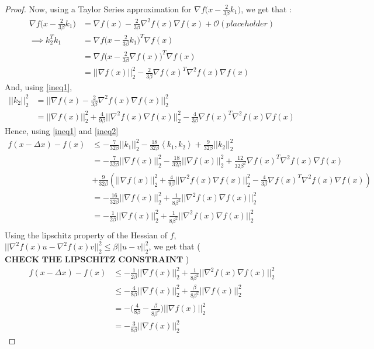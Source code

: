 \documentclass[12pt,twoside]{article}
\begin{document}
\begin{proof}
Now, using a Taylor Series approximation for $\nabla f \big( x - \frac{2}{3\beta}k_1 \big)$, we get that :
\begin{equation} 
\begin{aligned}\label{ineq1}
\nabla f \big( x - \frac{2}{3\beta}k_1 \big) &= \nabla f(x) - \frac{2}{3\beta} \nabla^2 f(x) \nabla f(x) + \mathcal{O}( placeholder ) \\
\implies  k_2^Tk_1 &= \nabla f \big( x - \frac{2}{3\beta}k_1 \big)^T\nabla f(x) \\
 &= \nabla f \big( x - \frac{2}{3\beta}\nabla f(x) \big)^T \nabla f(x) \\
&= || \nabla f(x) ||_2^2 - \frac{2}{3 \beta} \nabla f(x)^T \nabla^2 f(x) \nabla f(x)
\end{aligned}
\end{equation}
And, using \eqref{ineq1},
\begin{equation}
\begin{aligned} \label{ineq2}
|| k_2 ||_2^2 &= ||  \nabla f(x) - \frac{2}{3\beta} \nabla^2 f(x) \nabla f(x)  ||_2^2   \\
&= || \nabla f(x)||_2^2 + \frac{4}{9\beta}||\nabla^2 f(x) \nabla f(x)  ||_2^2 - \frac{4}{3\beta} \nabla f(x)^T \nabla^2 f(x) \nabla f(x)
\end{aligned}
\end{equation}
Hence, using \eqref{ineq1} and \eqref{ineq2}
\begin{align*}
f(x - \Delta x) - f(x) & \leq  -\frac{7}{32 \beta}|| k_1 ||_2^2 - \frac{18}{32 \beta} \left\langle k_1, k_2 \right\rangle + \frac{9}{32 \beta}|| k_2 ||_2^2 \\
&= -\frac{7}{32 \beta}|| \nabla f(x) ||_2^2 -  \frac{18}{32 \beta} || \nabla f(x) ||_2^2 + \frac{12}{32 \beta^2} \nabla f(x)^T \nabla^2 f(x) \nabla f(x) \\
&+  \frac{9}{32\beta}( || \nabla f(x)||_2^2 + \frac{4}{9\beta}||\nabla^2 f(x) \nabla f(x)  ||_2^2 - \frac{4}{3\beta} \nabla f(x)^T \nabla^2 f(x) \nabla f(x) )  \\
&= -\frac{16}{32 \beta}|| \nabla f(x)||_2^2 + \frac{1}{8 \beta^2}||\nabla^2 f(x) \nabla f(x)  ||_2^2 \\
&= -\frac{1}{2\beta} || \nabla f(x)||_2^2 + \frac{1}{8 \beta^2}||\nabla^2 f(x) \nabla f(x)  ||_2^2 \\
\end{align*}
Using the lipschitz property of the Hessian of $f$, $||\nabla^2 f(x) u - \nabla^2 f(x) v||_2^2 \leq \beta || u-v ||_2^2 $, we get that ($\textbf{CHECK THE LIPSCHITZ CONSTRAINT}$ )
\begin{equation}
\begin{aligned}
f(x - \Delta x) - f(x) & \leq -\frac{1}{2\beta} || \nabla f(x)||_2^2 + \frac{1}{8 \beta^2}||\nabla^2 f(x) \nabla f(x)  ||_2^2 \\
& \leq -\frac{4}{8\beta}|| \nabla f(x) ||_2^2 + \frac{\beta}{8 \beta^2}|| \nabla f(x) ||_2^2 \\
& = -\big( \frac{4}{8\beta} - \frac{\beta}{8\beta^2}   \big)  || \nabla f(x) ||_2^2  \\
&= -\frac{3}{8\beta} || \nabla f(x) ||_2^2   
\end{aligned}
\end{equation}
\end{proof}
\end{document}
